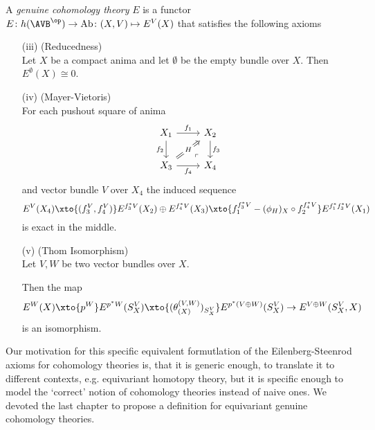   \begin{definition}\label{truedef}  
    A \emph{genuine cohomology theory} $E$ is a functor $E \colon h (\AVB^\op) \to \mathrm{Ab} \colon (X,V) \mapsto E^V(X)$
    that satisfies the following axioms 
    \begin{enumerate}
      \item[(iii)](Reducedness)\\
      Let $X$ be a compact anima and 
      let $\emptyset$ be the empty bundle over $X$. Then 
      $E^\emptyset(X) \cong 0$.
    \item[(iv)](Mayer-Vietoris)\\
    For each pushout square of anima
    \[\begin{tikzcd}
      {X_1} & {X_2} \\
      {X_3} & {X_4}
      \arrow["{f_1}", from=1-1, to=1-2]
      \arrow["{f_3}", from=1-2, to=2-2]
      \arrow["{f_2}"', from=1-1, to=2-1]
      \arrow["{f_4}"', from=2-1, to=2-2]
      \arrow["\lrcorner"{anchor=center, pos=0.125, rotate=180}, draw=none, from=2-2, to=1-1]
      \arrow["H"{description}, Rightarrow, from=2-1, to=1-2]
    \end{tikzcd}\]
    and vector bundle $V$ over $X_4$ the induced sequence
    \[
      E^{V}(X_4) \xto{(f_3^V,f_4^V)} E^{f_3^*V}(X_2)\oplus E^{f_4^*V}(X_3)
      \xto{f_1^{f_3^*V} - ({\phi_H})_X \circ f_2^{f_4^*V}} E^{f_1^*f_3^*V}(X_1)
      \]
    is exact in the middle.
    \item[(v)](Thom Isomorphism)\\
    Let $V,W$ be two vector bundles over $X$.
    \iffalse 
     Let
    \[E^{V\oplus W}(S_X^V,X) =
    E^{p^*(V\oplus W)}(S_X^V) \ominus E^{V\oplus W}(X)
    \] be the complement of
    the direct summand inside $E^{p^*(V\oplus W)}(S_X^{V})$ of $E^{V\oplus W}(X)$
    due to the retraction $\sigma^{p^*(V\oplus W)} \circ p^{V\oplus W} = \id$.
    \fi 
    Then the map
    \[
    E^W(X) \xto{p^W} E^{p^*W}(S_X^V) \xto{(\theta_{(X)}^{(V,W)})_{S_X^V}} E^{p^*(V \oplus W)}(S_X^V) \to E^{V\oplus W}(S_X^V,X)
    \]
    is an isomorphism.
    \end{enumerate}
  \end{definition}  
  
  \begin{remark}
    Our motivation for this specific equivalent formutlation of the Eilenberg-Steenrod axioms for cohomology theories is, that it is generic enough, to 
    translate it to different contexts, e.g. equivariant homotopy theory, but it is specific enough to model the `correct' notion of cohomology theories
    instead of naive ones. We devoted the last chapter to propose a definition for equivariant genuine cohomology theories.
  \end{remark}
  

